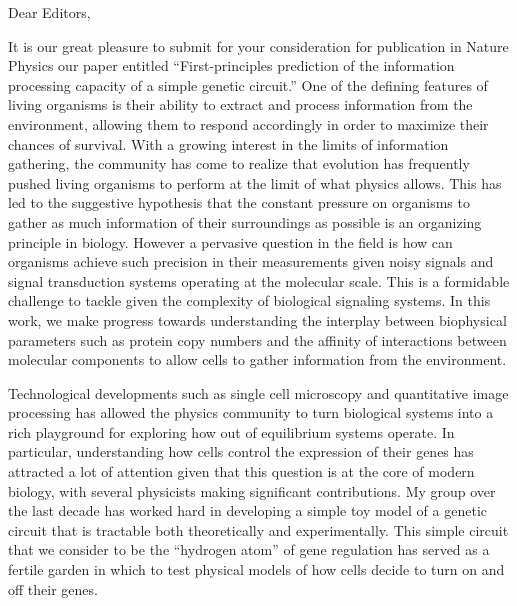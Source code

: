 




\date{\today}



Dear Editors,

It is our great pleasure to submit for your consideration for publication in
Nature Physics our paper entitled ``First-principles prediction of the
information processing capacity of a simple genetic circuit.'' One of the
defining features of living organisms is their ability to extract and process
information from the environment, allowing them to respond accordingly in order
to maximize their chances of survival. With a growing interest in the limits of
information gathering, the community has come to realize that evolution has
frequently pushed living organisms to perform at the limit of what physics
allows. This has led to the suggestive hypothesis that the constant pressure on
organisms to gather as much information of their surroundings as possible is an
organizing principle in biology. However a pervasive question in the field is
how can organisms achieve such precision in their measurements given noisy
signals and signal transduction systems operating at the molecular scale. This
is a formidable challenge to tackle given the complexity of biological signaling
systems. In this work, we make progress towards understanding the interplay
between biophysical parameters such as protein copy numbers and the affinity of
interactions between molecular components to allow cells to gather information
from the environment.

Technological developments such as single cell microscopy and quantitative image
processing has allowed the physics community to turn biological systems into a
rich playground for exploring how out of equilibrium systems operate. In
particular, understanding how cells control the expression of their genes has
attracted a lot of attention given that this question is at the core of modern
biology, with several physicists making significant contributions. My group over
the last decade has worked hard in developing a simple toy model of a genetic
circuit that is tractable both theoretically and experimentally. This simple
circuit that we consider to be the ``hydrogen atom'' of gene regulation has
served as a fertile garden in which to test physical models of how cells decide
to turn on and off their genes.


